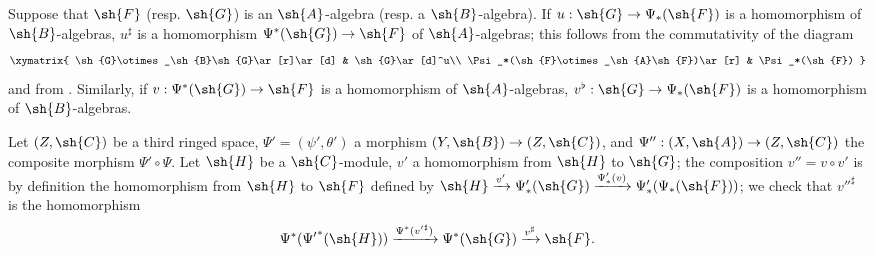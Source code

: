 \begin{env}[4.4.7]
\label{0.4.4.7}
Suppose that $\sh{F}$ (resp. $\sh{G}$) is an $\sh{A}$-algebra (resp. a $\sh{B}$-algebra). If
$u:\sh{G}\to\Psi_*(\sh{F})$ is a homomorphism of $\sh{B}$-algebras, $u^\sharp$ is a
homomorphism $\Psi^*(\sh{G})\to\sh{F}$ of $\sh{A}$-algebras; this follows from the
commutativity of the diagram
\[
  \xymatrix{
    \sh{G}\otimes_\sh{B}\sh{G}\ar[r]\ar[d] &
    \sh{G}\ar[d]^u\\
    \Psi_*(\sh{F}\otimes_\sh{A}\sh{F})\ar[r] &
    \Psi_*(\sh{F})
  }
\]
and from . Similarly, if $v:\Psi^*(\sh{G})\to\sh{F}$ is a homomorphism of
$\sh{A}$-algebras, $v^\flat:\sh{G}\to\Psi_*(\sh{F})$ is a homomorphism of $\sh{B}$-algebras.
\end{env}

\begin{env}[4.4.8]
\label{0.4.4.8}
Let $(Z,\sh{C})$ be a third ringed space, $\Psi'=(\psi',\theta')$ a morphism
$(Y,\sh{B})\to(Z,\sh{C})$, and $\Psi'':(X,\sh{A})\to(Z,\sh{C})$ the composite morphism
$\Psi'\circ\Psi$. Let $\sh{H}$ be a $\sh{C}$-module, $v'$ a homomorphism from $\sh{H}$ to
$\sh{G}$; the composition $v''=v\circ v'$ is by definition the homomorphism from $\sh{H}$ to
$\sh{F}$ defined by
$\sh{H}\xrightarrow{v'}\Psi_*'(\sh{G})\xrightarrow{\Psi_*'(v)}\Psi_*'(\Psi_*(\sh{F}))$; we
check that ${v''}^\sharp$ is the homomorphism
\[
  \Psi^*({\Psi'}^*(\sh{H}))\xrightarrow{\Psi^*({v'}^\sharp)}\Psi^*(\sh{G})
  \xrightarrow{v^\sharp}\sh{F}.
\]
\end{env}

